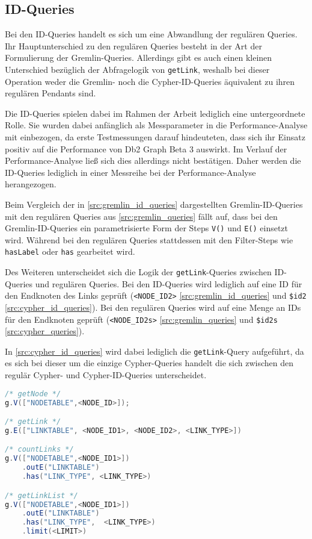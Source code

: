 \subsection{ID-Queries}
Bei den ID-Queries handelt es sich um eine Abwandlung der regulären Queries. Ihr Hauptunterschied zu den regulären Queries besteht in der Art der Formulierung der Gremlin-Queries. Allerdings gibt es auch einen kleinen Unterschied bezüglich der Abfragelogik von \texttt{getLink}, weshalb bei dieser Operation weder die Gremlin- noch die Cypher-ID-Queries äquivalent zu ihren regulären Pendants sind.

Die ID-Queries spielen dabei im Rahmen der Arbeit lediglich eine untergeordnete Rolle. Sie wurden dabei anfänglich als Messparameter in die Performance-Analyse mit einbezogen, da erste Testmessungen darauf hindeuteten, dass sich ihr Einsatz positiv auf die Performance von Db2 Graph Beta 3 auswirkt. Im Verlauf der Performance-Analyse ließ sich dies allerdings nicht bestätigen. Daher werden die ID-Queries lediglich in einer Messreihe bei der Performance-Analyse herangezogen. 

Beim Vergleich der in \autoref{src:gremlin_id_queries} dargestellten Gremlin-ID-Queries mit den regulären Queries aus \autoref{src:gremlin_queries} fällt auf, dass bei den Gremlin-ID-Queries ein parametrisierte Form der Steps \texttt{V()} und \texttt{E()} einsetzt wird. Während bei den regulären Queries stattdessen mit den Filter-Steps wie \texttt{hasLabel} oder \texttt{has} gearbeitet wird.

Des Weiteren unterscheidet sich die Logik der \texttt{getLink}-Queries zwischen ID-Queries und regulären Queries. Bei den ID-Queries wird lediglich auf eine ID für den Endknoten des Links geprüft (\texttt{<NODE\_ID2>} \autoref{src:gremlin_id_queries} und \texttt{\$id2} \autoref{src:cypher_id_queries}). Bei den regulären Queries wird auf eine Menge an IDs für den Endknoten geprüft (\texttt{<NODE\_ID2s>} \autoref{src:gremlin_queries} und \texttt{\$id2s} \autoref{src:cypher_queries}). 

In \autoref{src:cypher_id_queries} wird dabei lediglich die \texttt{getLink}-Query aufgeführt, da es sich bei dieser um die einzige Cypher-Queries handelt die sich zwischen den regulär Cypher- und Cypher-ID-Queries unterscheidet.

\begin{lstlisting}[label=src:gremlin_id_queries,caption={Gremlin ID-Queries},language=Java]
/* getNode */
g.V(["NODETABLE",<NODE_ID>]);

/* getLink */
g.E(["LINKTABLE", <NODE_ID1>, <NODE_ID2>, <LINK_TYPE>])

/* countLinks */
g.V(["NODETABLE",<NODE_ID1>])
    .outE("LINKTABLE")
    .has("LINK_TYPE", <LINK_TYPE>)

/* getLinkList */
g.V(["NODETABLE",<NODE_ID1>])
    .outE("LINKTABLE")
    .has("LINK_TYPE",  <LINK_TYPE>)
    .limit(<LIMIT>)
\end{lstlisting}

